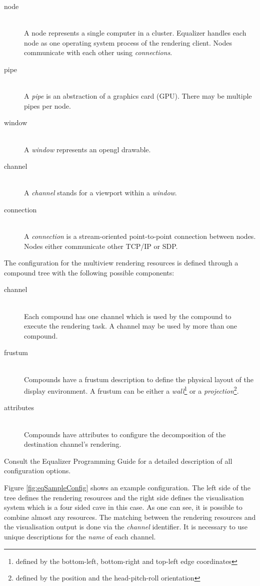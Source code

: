 \begin{description}
	\item[node] \hfill\\A node represents a single computer in a cluster. Equalizer handles each node as one operating system process of the rendering client. Nodes communicate with each other using \emph{connections}.
	\item[pipe] \hfill\\A \emph{pipe} is an abstraction of a graphics card (GPU). There may be multiple pipes per node.
	\item[window] \hfill\\A \emph{window} represents an \gls{opengl} drawable.
	\item[channel] \hfill\\A \emph{channel} stands for a viewport within a \emph{window}.
	\item[connection] \hfill\\A \emph{connection} is a stream-oriented point-to-point connection between nodes. Nodes either communicate other TCP/IP or SDP.
\end{description}

The configuration for the multiview rendering resources is defined through a compound tree with the following possible components:

\begin{description}
	\item[channel] \hfill\\Each compound has one channel which is used by the compound to execute the rendering task. A channel may be used by more than one compound.
	\item[frustum] \hfill\\Compounds have a frustum description to define the physical layout of the display environment. A frustum can be either a \emph{wall}\footnote{defined by the bottom-left, bottom-right and top-left edge coordinates} or a \emph{projection}\footnote{defined by the position and the head-pitch-roll orientation}.
	\item[attributes] \hfill\\Compounds have attributes to configure the decomposition of the destination channel's rendering.
\end{description}

Consult the Equalizer Programming Guide\cite{eqPG} for a detailed description of all configuration options.

Figure \ref{fig:eqSampleConfig} shows an example configuration. The left side of the tree defines the rendering resources and the right side defines the visualisation system which is a four sided \gls{cave} in this case. As one can see, it is possible to combine almost any resources. The matching between the rendering resources and the visualisation output is done via the \emph{channel} identifier. It is necessary to use unique descriptions for the \emph{name} of each channel.

